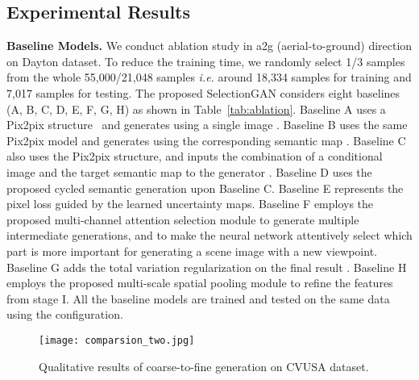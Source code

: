 \documentclass[10pt,twocolumn,letterpaper]{article}
\begin{document}
\subsection{Experimental Results}
\vspace{-0.2cm}
\noindent\textbf{Baseline Models.} 
We conduct ablation study in a2g (aerial-to-ground) direction on Dayton dataset. To reduce the training time, we randomly select 1/3 samples from the whole 55,000/21,048 samples \emph{i.e.} around 18,334 samples for training and 7,017 samples for testing. The proposed SelectionGAN considers eight baselines (A, B, C, D, E, F, G, H) as shown in Table~\ref{tab:ablation}. 
Baseline A uses a Pix2pix structure~\cite{isola2017image} and generates  using a single image . 
Baseline B uses the same Pix2pix model and generates  using the corresponding semantic map .
Baseline C also uses the Pix2pix structure, and inputs the combination of a conditional image  and the target semantic map  to the generator .
Baseline D uses the proposed cycled semantic generation upon Baseline C.
Baseline E represents the pixel loss guided by the learned uncertainty maps.
Baseline F employs the proposed multi-channel attention selection module to generate multiple intermediate generations, and to make the neural network attentively select which part is more important for generating a scene image with a new viewpoint. 
Baseline G adds the total variation regularization on the final result .
Baseline H employs the proposed multi-scale spatial pooling module to refine the features  from stage I. All the baseline models are trained and tested on the same data using the configuration.

\begin{figure}[!t] \small
	\centering
	\texttt{[image: comparsion\_two.jpg]}
	\caption{Qualitative results of coarse-to-fine generation on CVUSA dataset.
	}
	\label{fig:cvusa1}
\end{figure}
\end{document}
